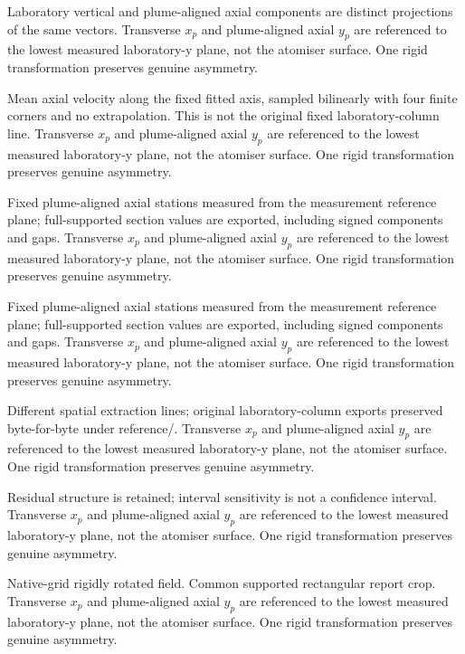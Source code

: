 \caption{Laboratory vertical and plume-aligned axial components are distinct projections of the same vectors. Transverse $x_p$ and plume-aligned axial $y_p$ are referenced to the lowest measured laboratory-y plane, not the atomiser surface. One rigid transformation preserves genuine asymmetry.}

\caption{Mean axial velocity along the fixed fitted axis, sampled bilinearly with four finite corners and no extrapolation. This is not the original fixed laboratory-column line. Transverse $x_p$ and plume-aligned axial $y_p$ are referenced to the lowest measured laboratory-y plane, not the atomiser surface. One rigid transformation preserves genuine asymmetry.}

\caption{Fixed plume-aligned axial stations measured from the measurement reference plane; full-supported section values are exported, including signed components and gaps. Transverse $x_p$ and plume-aligned axial $y_p$ are referenced to the lowest measured laboratory-y plane, not the atomiser surface. One rigid transformation preserves genuine asymmetry.}

\caption{Fixed plume-aligned axial stations measured from the measurement reference plane; full-supported section values are exported, including signed components and gaps. Transverse $x_p$ and plume-aligned axial $y_p$ are referenced to the lowest measured laboratory-y plane, not the atomiser surface. One rigid transformation preserves genuine asymmetry.}

\caption{Different spatial extraction lines; original laboratory-column exports preserved byte-for-byte under reference/. Transverse $x_p$ and plume-aligned axial $y_p$ are referenced to the lowest measured laboratory-y plane, not the atomiser surface. One rigid transformation preserves genuine asymmetry.}

\caption{Residual structure is retained; interval sensitivity is not a confidence interval. Transverse $x_p$ and plume-aligned axial $y_p$ are referenced to the lowest measured laboratory-y plane, not the atomiser surface. One rigid transformation preserves genuine asymmetry.}

\caption{Native-grid rigidly rotated field. Common supported rectangular report crop. Transverse $x_p$ and plume-aligned axial $y_p$ are referenced to the lowest measured laboratory-y plane, not the atomiser surface. One rigid transformation preserves genuine asymmetry.}

